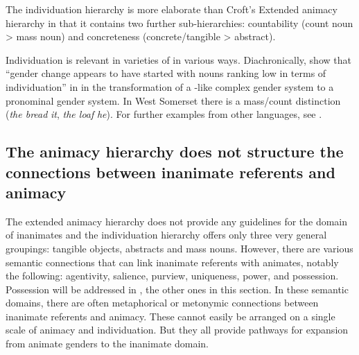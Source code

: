 \documentclass[output=collectionpaper]{langsci/langscibook}
\begin{document}
The individuation hierarchy is more elaborate than Croft's Extended animacy hierarchy in that it contains two further sub-hierarchies: countability (count noun > mass noun) and concreteness (concrete/tangible > abstract).

Individuation is relevant in varieties of  in various ways. Diachronically, \cite[527]{Siemund2011} show that ``gender change appears to have started with nouns ranking low in terms of individuation'' in  in the transformation of a -like complex gender system to a pronominal gender system. In West Somerset  there is a mass/count distinction (\textit{the bread} \textendash{} \textit{it}, \textit{the loaf} \textendash{} \textit{he}). For further examples from other languages, see \cite[175--217]{Siemund2008}.

  \subsection{The animacy hierarchy does not structure the connections between inanimate referents and animacy}
\label{sec:WDG:3.3}

The extended animacy hierarchy does not provide any guidelines for the domain of inanimates and the individuation hierarchy offers only three very general groupings: tangible objects, abstracts and mass nouns. However, there are various semantic connections that can link inanimate referents with animates, notably the following: agentivity, salience, purview, uniqueness, power, and possession. Possession will be addressed in , the other ones in this section. In these semantic domains, there are often metaphorical or metonymic connections between inanimate referents and animacy. These cannot easily be arranged on a single scale of animacy and individuation. But they all provide pathways for expansion from animate genders to the inanimate domain.
\end{document}
